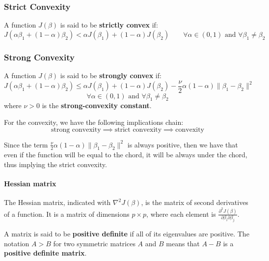 \subsubsection*{Strict Convexity}

\begin{definition}
    A function $J(\beta)$ is said to be \textbf{strictly convex} if:
    \[
        J(\alpha \beta_1 + (1-\alpha)\beta_2) < \alpha J(\beta_1) + (1-\alpha)J(\beta_2) \qquad \forall \alpha \in (0,1) \text{ and } \forall \beta_1 \neq \beta_2
    \]
\end{definition}

\subsubsection*{Strong Convexity}
\begin{definition}
    A function $J(\beta)$ is said to  be \textbf{strongly convex} if:
    \[
        J(\alpha \beta_1 + (1-\alpha)\beta_2) \leq \alpha J(\beta_1) + (1-\alpha)J(\beta_2) - \frac{\nu}{2} \alpha (1-\alpha) \| \beta_1 - \beta_2 \|^2
    \]
    \[
        \forall \alpha \in (0,1) \text{ and } \forall \beta_1 \neq \beta_2
    \]
    where $\nu >0 $ is the \textbf{strong-convexity constant}.
\end{definition}

\begin{theorem}
    For the convexity, we have the following implications chain:
    \[
        \text{strong convexity} \implies \text{strict convexity} \implies \text{convexity}
    \]
\end{theorem}
Since the term $\frac{\nu}{2} \alpha (1-\alpha) \| \beta_1 - \beta_2 \|^2$ is always positive, then we have that even if the function will be equal to the chord, it will be always under the chord, thus implying the strict convexity.
\paragraph*{Hessian matrix}
The Hessian matrix, indicated with $\nabla^2 J(\beta)$, is the matrix of second derivatives of a function. It is a matrix of dimensions $p \times p$, where each element is $\frac{\partial^2 J(\beta)}{\partial \beta_i \partial \beta_j}$.

\begin{definition}
    A matrix is said to be \textbf{positive definite} if all of its eigenvalues are positive. The notation $A > B$ for two symmetric matrices $A$ and $B$ means that $A-B$ is a \textbf{positive definite matrix}.
\end{definition}


